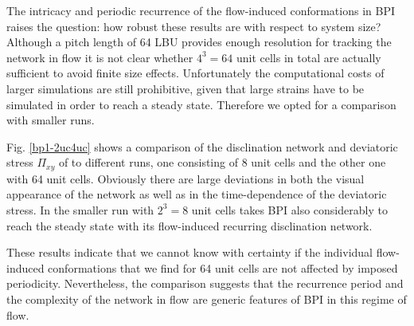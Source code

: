 \documentclass[aps,pre,reprint,superscriptaddress, twocolumn]{revtex4}
\begin{document}
The intricacy and periodic recurrence of the flow-induced conformations 
in BPI raises the question: how robust these results are with respect to 
system size? Although a pitch length of 64 LBU provides enough resolution 
for tracking the network in flow it is not clear whether $4^3=64$ unit cells 
in total are actually sufficient to avoid finite size effects.
Unfortunately the computational costs of larger simulations are still
prohibitive, given that large strains have to
be simulated in order to reach a steady state. Therefore we opted for a 
comparison with smaller runs.

Fig. \ref{bp1-2uc4uc} shows a comparison of the disclination network and 
deviatoric stress $\Pi_{xy}$ of to different runs, one consisting of 8 
unit cells and the other one with 64 unit cells.
Obviously there are large deviations in both the visual appearance of the 
network as well as in the time-dependence of the deviatoric stress.
In the smaller run with $2^3=8$ unit cells takes BPI also considerably 
to reach the 
steady state with its flow-induced recurring disclination network. 

These results indicate that we cannot know with certainty if the individual 
flow-induced conformations that we find for 64 unit cells are not affected 
by imposed periodicity. Nevertheless, the comparison suggests that 
the recurrence period and the complexity of the network in flow are  
generic features of BPI in this regime of flow.
 
\end{document}
